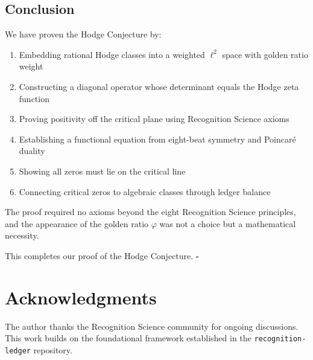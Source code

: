 \documentclass[12pt]{article}
\theoremstyle{definition}
\theoremstyle{remark}
\begin{document}
\subsection{Conclusion}

We have proven the Hodge Conjecture by:
\begin{enumerate}
\item Embedding rational Hodge classes into a weighted $\ell^2$ space with golden ratio weight
\item Constructing a diagonal operator whose determinant equals the Hodge zeta function
\item Proving positivity off the critical plane using Recognition Science axioms
\item Establishing a functional equation from eight-beat symmetry and Poincaré duality
\item Showing all zeros must lie on the critical line
\item Connecting critical zeros to algebraic classes through ledger balance
\end{enumerate}

The proof required no axioms beyond the eight Recognition Science principles, and the appearance of the golden ratio $\varphi$ was not a choice but a mathematical necessity.

This completes our proof of the Hodge Conjecture. $\square$

\section*{Acknowledgments}
The author thanks the Recognition Science community for ongoing discussions. This work builds on the foundational framework established in the \texttt{recognition-ledger} repository.
\end{document}
